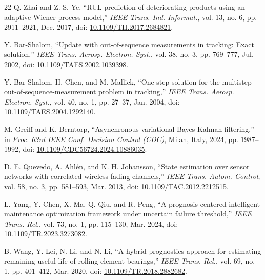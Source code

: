 \documentclass[journal]{IEEEtran}
\begin{document}
\begin{thebibliography}{22}
Q. Zhai and Z.-S. Ye, ``RUL prediction of deteriorating products using an
adaptive Wiener process model,'' \emph{IEEE Trans. Ind. Informat.}, vol.
13, no. 6, pp. 2911--2921, Dec. 2017, doi:
\href{https://doi.org/10.1109/TII.2017.2684821}{10.1109/TII.2017.2684821}.

Y. Bar-Shalom, ``Update with out-of-sequence measurements in tracking:
Exact solution,'' \emph{IEEE Trans. Aerosp. Electron. Syst.}, vol. 38, no.
3, pp. 769--777, Jul. 2002, doi:
\href{https://doi.org/10.1109/TAES.2002.1039398}{10.1109/TAES.2002.1039398}.

Y. Bar-Shalom, H. Chen, and M. Mallick, ``One-step solution for the multistep
out-of-sequence-measurement problem in tracking,'' \emph{IEEE Trans. Aerosp.
Electron. Syst.}, vol. 40, no. 1, pp. 27--37, Jan. 2004, doi:
\href{https://doi.org/10.1109/TAES.2004.1292140}{10.1109/TAES.2004.1292140}.

M. Greiff and K. Berntorp, ``Asynchronous variational-Bayes Kalman
filtering,'' in \emph{Proc. 63rd IEEE Conf. Decision Control (CDC)}, Milan,
Italy, 2024, pp. 1987--1992, doi:
\href{https://doi.org/10.1109/CDC56724.2024.10886035}{10.1109/CDC56724.2024.10886035}.

D. E. Quevedo, A. Ahl\'en, and K. H. Johansson, ``State estimation over
sensor networks with correlated wireless fading channels,'' \emph{IEEE
Trans. Autom. Control}, vol. 58, no. 3, pp. 581--593, Mar. 2013, doi:
\href{https://doi.org/10.1109/TAC.2012.2212515}{10.1109/TAC.2012.2212515}.

L. Yang, Y. Chen, X. Ma, Q. Qiu, and R. Peng, ``A prognosis-centered
intelligent maintenance optimization framework under uncertain failure
threshold,'' \emph{IEEE Trans. Rel.}, vol. 73, no. 1, pp. 115--130, Mar.
2024, doi:
\href{https://doi.org/10.1109/TR.2023.3273082}{10.1109/TR.2023.3273082}.

B. Wang, Y. Lei, N. Li, and N. Li, ``A hybrid prognostics approach for
estimating remaining useful life of rolling element bearings,''
\emph{IEEE Trans. Rel.}, vol. 69, no. 1, pp. 401--412, Mar. 2020, doi:
\href{https://doi.org/10.1109/TR.2018.2882682}{10.1109/TR.2018.2882682}.

\end{thebibliography}
\end{document}
